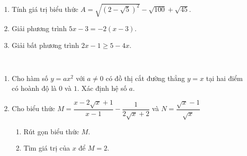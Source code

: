 \setcounter{deso}{3}
\begin{name}
	{\tenchude}
	{\tendethi}
	{\tentruong}
	{\thoigian}
\end{name}
\begin{bt}[1,5 điểm]~
\begin{enumerate}[1.]
    \item Tính giá trị biểu thức $A=\sqrt{(2-\sqrt{5})^2}-\sqrt{100}+\sqrt{45}$.
    \item Giải phương trình $5x-3=-2(x-3)$.
    \item Giải bất phương trình $2x-1 \ge 5-4x$.
\end{enumerate}
\end{bt}

\begin{bt}[2,0 điểm]~
\begin{enumerate}[1.]
    \item Cho hàm số $y=ax^2$ với $a \ne 0$ có đồ thị cắt đường thẳng $y=x$ tại hai điểm có hoành độ là $0$ và $1$. Xác định hệ số $a$.
    \item Cho biểu thức $M=\dfrac{x-2\sqrt{x}+1}{x-1}-\dfrac{1}{2\sqrt{x}+2}$ và $N=\dfrac{\sqrt{x}-1}{\sqrt{x}}$
    \begin{enumerate}
        \item Rút gọn biểu thức $M$.
        \item Tìm giá trị của $x$ để $M=2$.
    \end{enumerate}
\end{enumerate}
\end{bt}
